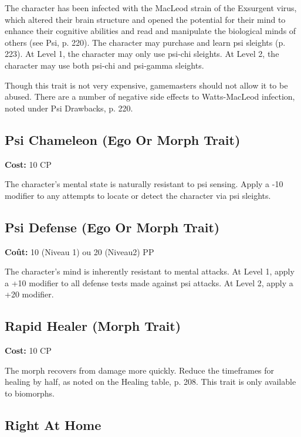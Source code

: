 The character has been infected with the MacLeod strain of the Exsurgent virus, which altered their brain structure and opened the potential for their mind to enhance their cognitive abilities and read and manipulate the biological minds of others (see Psi, p. 220). The character may purchase and learn psi sleights (p. 223). At Level 1, the character may only use psi-chi sleights. At Level 2, the character may use both psi-chi and psi-gamma sleights. 

Though this trait is not very expensive, gamemasters should not allow it to be abused. There are a number of negative side effects to Watts-MacLeod infection, noted under Psi Drawbacks, p. 220. 

\subsection{Psi Chameleon (Ego Or Morph Trait)} \label{sec:traits-psi-chameleon} 

\textbf{Cost:} 10 CP 

The character’s mental state is naturally resistant to psi sensing. Apply a -10 modifier to any attempts to locate or detect the character via psi sleights. 

\subsection{Psi Defense (Ego Or Morph Trait)} \label{sec:traits-psi-defense} 

\textbf{Coût:} 10 (Niveau 1) ou 20 (Niveau2) PP 

The character’s mind is inherently resistant to mental attacks. At Level 1, apply a +10 modifier to all defense tests made against psi attacks. At Level 2, apply a +20 modifier. 

\subsection{Rapid Healer (Morph Trait)} \label{sec:traits-rapid-healer} 

\textbf{Cost:} 10 CP 

The morph recovers from damage more quickly. Reduce the timeframes for healing by half, as noted on the Healing table, p. 208. This trait is only available to biomorphs. 

\subsection{Right At Home} \label{sec:traits-right-at-home} 

